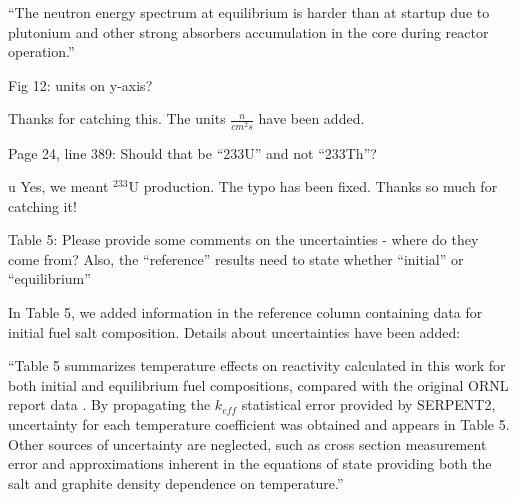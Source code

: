 \documentclass[answers,11pt]{exam}
\begin{document}
\begin{questions}
\begin{solution}
                         ``The neutron energy spectrum at equilibrium is harder 
                         than at startup due to plutonium and other strong 
                         absorbers accumulation in the core during reactor 
                         operation.''
        \end{solution}

        \question  Fig 12: units on y-axis?
        \begin{solution}
                Thanks for catching this. The units $\frac{n}{cm^2 s}$ have been added.
        \end{solution}

        \question  Page 24, line 389: Should that be ``233U'' and not ``233Th''?
        \begin{solution}
u                Yes, we meant $^{233}$U production. The typo has been fixed. 
                Thanks so much for catching it!
        \end{solution}

        \question  Table 5: Please provide some comments on the uncertainties - 
        where do they come from? Also, the ``reference'' results need to state 
        whether ``initial'' or ``equilibrium''
        \begin{solution}
                In Table 5, we added information in the reference column 
                containing data for initial fuel salt composition. Details 
                about uncertainties have been added:

                ``Table 5 summarizes temperature effects on reactivity calculated 
                in this work for both initial and equilibrium fuel 
                compositions, compared with the original \gls{ORNL} report data 
                \cite{robertson_conceptual_1971}.  By propagating the $k_{eff}$  
                statistical error provided by SERPENT2, uncertainty for each 
                temperature coefficient was obtained and appears in Table 5. 
                Other sources of uncertainty are neglected, such as cross 
                section measurement error and approximations inherent in the 
                equations of state providing both the salt and graphite density 
                dependence on temperature.''

        \end{solution}


\end{questions}
\end{document}
